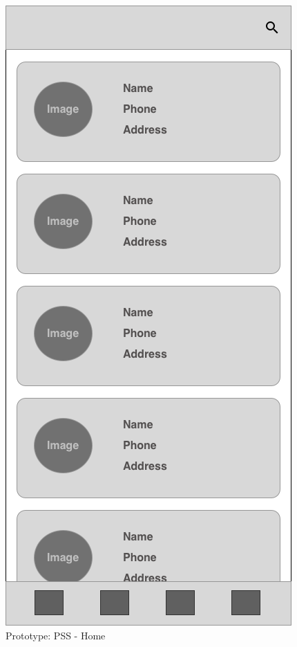 \begin{figure}[ht]
    \centering
    \includegraphics[scale=0.50]{../images/prototype-pss-home.png}
    \caption{Prototype: PSS - Home}
    \label{fig:pss-prototype-home}
\end{figure}

